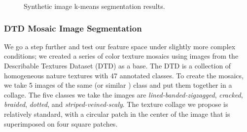\documentclass[journal]{IEEEtran}
\begin{document}
%        	    

\begin{figure}[!t]
\centering
{}
\hfil
{}
\caption{Synthetic image k-means segmentation results.}\label{fig:kmeans_segms_synthetic_img}   
\end{figure}

\subsubsection{DTD Mosaic Image Segmentation}
We go a step further and test our feature space under slightly more complex conditions; we created a series of color texture mosaics using images from the Describable Textures Dataset (DTD) \cite{Cimpoi.Maji.ea:CVPR:2014} as a base. The DTD is a collection of homogeneous nature textures with 47 annotated classes. To create the mosaics, we take 5 images of the same (or similar ) class and put them together in a collage. The five classes we take the images are \textit{lined-banded-zigzagged}, \textit{cracked}, \textit{braided}, \textit{dotted}, and \textit{striped-veined-scaly}. The texture collage we propose is relatively standard, with a circular patch in the center of the image that is superimposed on four square patches. 
\end{document}
